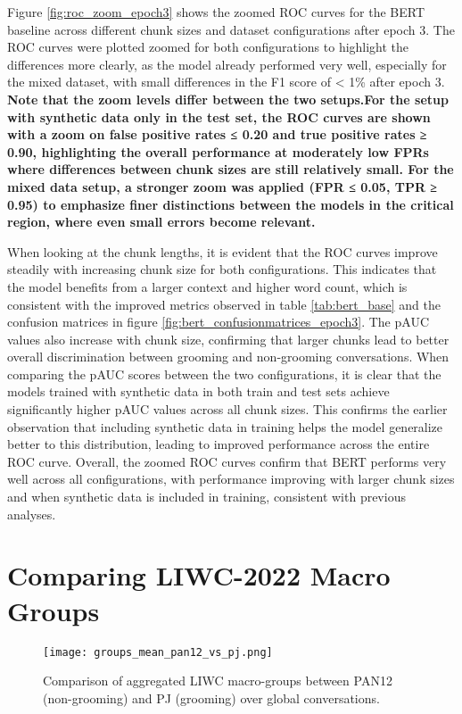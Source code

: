 Figure \ref{fig:roc_zoom_epoch3} shows the zoomed ROC curves for the BERT baseline across different chunk sizes and dataset configurations after epoch 3. The ROC curves were plotted zoomed for both configurations to highlight the differences more clearly, as the model already performed very well, especially for the mixed dataset, with small differences in the F1 score of < 1\% after epoch 3. \textbf{Note that the zoom levels differ between the two setups.For the setup with synthetic data only in the test set, the ROC curves are shown with a zoom on false positive rates ≤ 0.20 and true positive rates ≥ 0.90, highlighting the overall performance at moderately low FPRs where differences between chunk sizes are still relatively small. For the mixed data setup, a stronger zoom was applied (FPR ≤ 0.05, TPR ≥ 0.95) to emphasize finer distinctions between the models in the critical region, where even small errors become relevant.} 

When looking at the chunk lengths, it is evident that the ROC curves improve steadily with increasing chunk size for both configurations. This indicates that the model benefits from a larger context and higher word count, which is consistent with the improved metrics observed in table \ref{tab:bert_base} and the confusion matrices in figure \ref{fig:bert_confusionmatrices_epoch3}. The pAUC values also increase with chunk size, confirming that larger chunks lead to better overall discrimination between grooming and non-grooming conversations. When comparing the pAUC scores between the two configurations, it is clear that the models trained with synthetic data in both train and test sets achieve significantly higher pAUC values across all chunk sizes. This confirms the earlier observation that including synthetic data in training helps the model generalize better to this distribution, leading to improved performance across the entire ROC curve. Overall, the zoomed ROC curves confirm that BERT performs very well across all configurations, with performance improving with larger chunk sizes and when synthetic data is included in training, consistent with previous analyses.

\section{Comparing LIWC-2022 Macro Groups} \label{sec:global_liwc_analysis}


\begin{figure}[ht]
    \centering
    \texttt{[image: groups\_mean\_pan12\_vs\_pj.png]}
    \caption[Comparison of aggregated LIWC macro-groups]{Comparison of aggregated LIWC macro-groups between PAN12 (non-grooming) and PJ (grooming) over global conversations.}
    \label{fig:liwc_macro_groups}
\end{figure}


